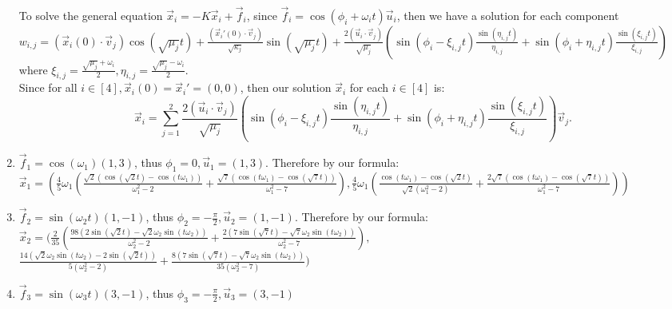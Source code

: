 \documentclass[12pt, letterpaper]{article}
\begin{document}
\begin{enumerate}
$$   $$\\
    To solve the general equation $\Vec{x}_i = -K \Vec{x}_i + \Vec{f}_i$, since $\Vec{f}_i = \cos (\phi_i + \omega_i t) \Vec{u}_i$, then we have a solution for each component 
   $w_{i,j} = (\Vec{x}_i (0) \cdot \Vec{v}_j)\cos(\sqrt{\mu_j} t) + \frac{(\Vec{x}_i' (0) \cdot \Vec{v}_j)}{\sqrt{\kappa_j}} \sin(\sqrt{\mu_j} t) + \frac{2(\Vec{u}_i\cdot \Vec{v}_j)}{\sqrt{\mu_j}}\left( \sin(\phi_{i} - \xi_{i,j} t) \frac{\sin(\eta_{i,j} t)}{\eta_{i,j}}+\sin(\phi_{i} + \eta_{i,j} t) \frac{\sin(\xi_{i,j} t)}{\xi_{i,j}} \right)$
   where $\xi_{i,j} = \frac{ \sqrt{\mu_j} + \omega_i }{2},\eta_{i,j} = \frac{ \sqrt{\mu_j}-\omega_i}{2}$.\\
   Since for all $i \in [4], \Vec{x}_i (0) = \Vec{x}_i' = (0,0)$, then our solution $\Vec{x}_i$ for each $i\in [4]$ is:
   $$
   \Vec{x}_i = \sum_{j=1}^2  \frac{2(\Vec{u}_i\cdot \Vec{v}_j)}{\sqrt{\mu_j}}\left( \sin(\phi_{i} - \xi_{i,j} t) \frac{\sin(\eta_{i,j} t)}{\eta_{i,j}}+\sin(\phi_{i} + \eta_{i,j} t) \frac{\sin(\xi_{i,j} t)}{\xi_{i,j}} \right) \Vec{v}_j.
   $$
   \item $\Vec{f}_1 = \cos(\omega_1)(1,3)$, thus $\phi_1 = 0, \Vec{u}_1 = (1,3)$.  Therefore by our formula:\\
   $
   \Vec{x}_1 = \left( \frac{4}{5} \omega_1 \left(\frac{\sqrt{2} \left(\cos
   \left(\sqrt{2} t\right)-\cos (t \omega_1)\right)}{\omega_1^2-2}+\frac{\sqrt{7} \left(\cos (t \omega_1)-\cos \left(\sqrt{7}
   t\right)\right)}{\omega_1^2-7}\right),\frac{4}{5} \omega_1
   \left(\frac{\cos (t \omega_1)-\cos \left(\sqrt{2} t\right)}{\sqrt{2}
   \left(\omega_1^2-2\right)}+\frac{2 \sqrt{7} \left(\cos (t
   \omega_1)-\cos \left(\sqrt{7} t\right)\right)}{\omega_1^2-7}\right)\right)
   $
   \item $\Vec{f}_2 = \sin (\omega_2 t) (1,-1)$, thus $\phi_2 = -\frac{\pi}{2}, \Vec{u}_2 = (1,-1)$.
   Therefore by our formula:\\
   $
   \Vec{x}_2 = (\frac{2}{35} \left(\frac{98 \left(2 \sin \left(\sqrt{2} t\right)-\sqrt{2}
   \omega_2 \sin (t \omega_2)\right)}{\omega_2^2-2}+\frac{2 \left(7 \sin \left(\sqrt{7} t\right)-\sqrt{7}\omega_2 \sin (t \omega_2)\right)}{\omega_2^2-7}\right),$\\
   $
   \frac{14
   \left(\sqrt{2} \omega_2 \sin (t \omega_2)-2 \sin
   \left(\sqrt{2} t\right)\right)}{5 \left(\omega_2^2-2\right)}+\frac{8
   \left(7 \sin \left(\sqrt{7} t\right)-\sqrt{7} \omega_2 \sin (t
   \omega_2)\right)}{35 \left(\omega_2^2-7\right)})
   $
   \item $\Vec{f}_3 = \sin (\omega_3 t) (3,-1)$, thus $\phi_3 = -\frac{\pi}{2}, \Vec{u}_3 = (3,-1)$

\end{enumerate}
\end{document}
